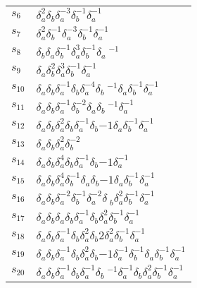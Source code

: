 \documentclass{article}
\begin{document}
\begin{center}
\begin{tabular}{ll}
$s_{6}$ & $\delta_a^{2}\delta_b^{}\delta_a^{-3}\delta_b^{-1}\delta_a^{-1}$ \\
$s_{7}$ & $\delta_a^{2}\delta_b^{-1}\delta_a^{-3}\delta_b^{-1}\delta_a^{-1}$ \\
$s_{8}$ & $\delta_b^{}\delta_a^{}\delta_b^{-1}\delta_a^{3}\delta_b^{-1}\delta_a\
^{-1}$ \\
$s_{9}$ & $\delta_a^{}\delta_b^{2}\delta_a^{3}\delta_b^{-1}\delta_a^{-1}$ \\
$s_{10}$ & $\delta_a^{}\delta_b^{}\delta_a^{-1}\delta_b^{}\delta_a^{-4}\delta_b\
^{-1}\delta_a^{}\delta_b^{-1}\delta_a^{-1}$ \\
$s_{11}$ & $\delta_a^{}\delta_b^{}\delta_a^{-1}\delta_b^{-2}\delta_a^{}\delta_b\
^{-1}\delta_a^{-1}$ \\
$s_{12}$ & $\delta_a^{}\delta_b^{}\delta_a^{2}\delta_b^{}\delta_a^{-1}\delta_b^\
{-1}\delta_a^{}\delta_b^{-1}\delta_a^{-1}$ \\
$s_{13}$ & $\delta_a^{}\delta_b^{}\delta_a^{2}\delta_b^{-2}$ \\
$s_{14}$ & $\delta_a^{}\delta_b^{}\delta_a^{4}\delta_b^{}\delta_a^{-1}\delta_b^\
{-1}\delta_a^{-1}$ \\
$s_{15}$ & $\delta_a^{}\delta_b^{}\delta_a^{4}\delta_b^{-1}\delta_a^{}\delta_b^\
{-1}\delta_a^{}\delta_b^{-1}\delta_a^{-1}$ \\
$s_{16}$ & $\delta_a^{}\delta_b^{}\delta_a^{-2}\delta_b^{-1}\delta_a^{-2}\delta\
_b^{}\delta_a^{2}\delta_b^{-1}\delta_a^{-1}$ \\
$s_{17}$ & $\delta_a^{}\delta_b^{}\delta_a^{}\delta_b^{}\delta_a^{-1}\delta_b^{\
}\delta_a^{2}\delta_b^{-1}\delta_a^{-1}$ \\
$s_{18}$ & $\delta_a^{}\delta_b^{}\delta_a^{-1}\delta_b^{}\delta_a^{2}\delta_b^\
{2}\delta_a^{2}\delta_b^{-1}\delta_a^{-1}$ \\
$s_{19}$ & $\delta_a^{}\delta_b^{}\delta_a^{-1}\delta_b^{}\delta_a^{2}\delta_b^\
{-1}\delta_a^{-1}\delta_b^{-1}\delta_a^{}\delta_b^{-1}\delta_a^{-1}$ \\
$s_{20}$ & $\delta_a^{}\delta_b^{}\delta_a^{-1}\delta_b^{}\delta_a^{-1}\delta_b\
^{-1}\delta_a^{-1}\delta_b^{}\delta_a^{2}\delta_b^{-1}\delta_a^{-1}$ \\
\bottomrule
\end{tabular}
\end{center}

\thispagestyle{empty}
\end{document}
